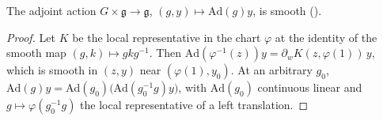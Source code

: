 \begin{proposition}
  \label{prop:Ad-smooth}
  \leanok
  The adjoint action $G \times \mathfrak g \to \mathfrak g$, $(g, y) \mapsto \mathrm{Ad}(g)y$, is smooth
  (\cite[after Definition 5.2.4]{GN26}).
\end{proposition}

\begin{proof}
  \leanok
  Let $K$ be the local representative in the chart $\varphi$ at the identity of the smooth map
  $(g, k) \mapsto gkg^{-1}$. Then $\mathrm{Ad}(\varphi^{-1}(z))y = \partial_w K(z, \varphi(1))\,y$, which is
  smooth in $(z, y)$ near $(\varphi(1), y_0)$. At an arbitrary $g_0$,
  $\mathrm{Ad}(g)y = \mathrm{Ad}(g_0)\bigl(\mathrm{Ad}(g_0^{-1}g)y\bigr)$, with $\mathrm{Ad}(g_0)$ continuous
  linear and $g \mapsto \varphi(g_0^{-1}g)$ the local representative of a left translation.
\end{proof}

